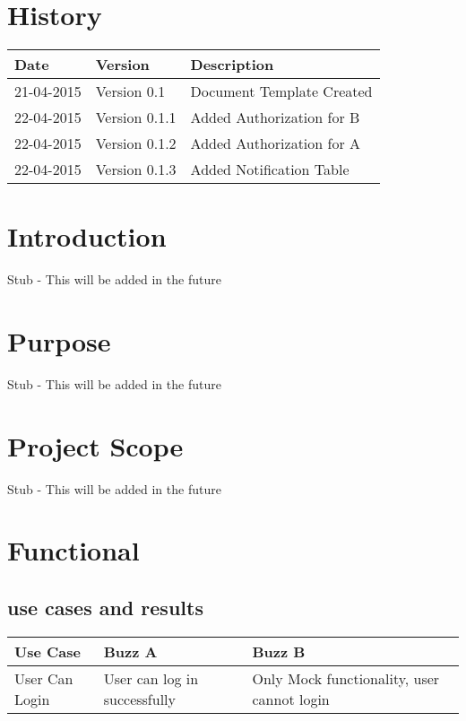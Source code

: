 \documentclass[12pt]{article}
\begin{document}


\section{History}
\begin{tabular}{|p{3cm}|p{5cm}|p{6cm}|}

\hline
Date & Version & Description\\ %
\hline
21-04-2015 & Version 0.1 & Document Template Created\\ %
\hline
22-04-2015 & Version 0.1.1 & Added Authorization for B\\ %
\hline
22-04-2015 & Version 0.1.2 & Added Authorization for A\\ %
\hline
22-04-2015 & Version 0.1.3 & Added Notification Table\\ %
\hline


\end{tabular}

\newpage
\tableofcontents
\newpage

\section{Introduction} %
Stub - This will be added in the future

\section{Purpose} %
Stub - This will be added in the future


\section{Project Scope} %
Stub - This will be added in the future

\section{Functional} %
\subsection{use cases and results}
\begin{tabular}{|p{4.5cm}|p{4.5cm}|p{4.5cm}|}

\hline
Use Case & Buzz A & Buzz B \\ %
\hline
User Can Login & User can log in successfully & Only Mock functionality, user cannot login\\ %
\hline


\end{tabular}
\end{document}
